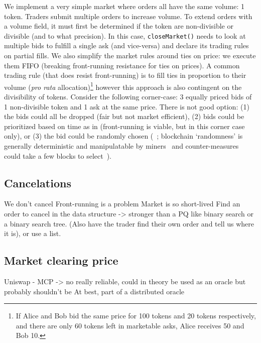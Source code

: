 We implement a very simple market where orders all have the same volume: 1 token. Traders submit multiple orders to increase volume. To extend orders with a volume field, it must first be determined if the token are non-divisible or divisible (and to what precision). In this case, \texttt{closeMarket()} needs to look at multiple bids to fulfill a single ask (and vice-versa) and declare its trading rules on partial fills. We also simplify the market rules around ties on price: we execute them FIFO (breaking front-running resistance for ties on prices). A common trading rule (that does resist front-running) is to fill ties in proportion to their volume (\ie \textit{pro rata} allocation)\footnote{If Alice and Bob bid the same price for 100 tokens and 20 tokens respectively, and there are only 60 tokens left in marketable asks, Alice receives 50 and Bob 10.} however this approach is also contingent on the divisibility of tokens. Consider the following corner-case: 3 equally priced bids of 1 non-divisible token and 1 ask at the same price. There is not good option: (1) the bids could all be dropped (fair but not market efficient), (2) bids could be prioritized based on time as in \cm (front-running is viable, but in this corner case only), or (3) the bid could be randomly chosen (\cf~\cite{mavroudis2019libra}; blockchain `randomness' is generally deterministic and manipulatable by miners~\cite{bonneau2015random,buenz2017proofs} and counter-measures could take a few blocks to select~\cite{boneh2018verifiable}).

\subsection{Cancelations}

We don't cancel
Front-running is a problem
Market is so short-lived
Find an order to cancel in the data structure -> stronger than a PQ like binary search or a binary search tree. (Also have the trader find their own order and tell us where it is), or use a list. 

\subsection{Market clearing price}

Uniswap - 
MCP -> no really reliable, could in theory be used as an oracle but probably shouldn't be 
At best, part of a distributed oracle


